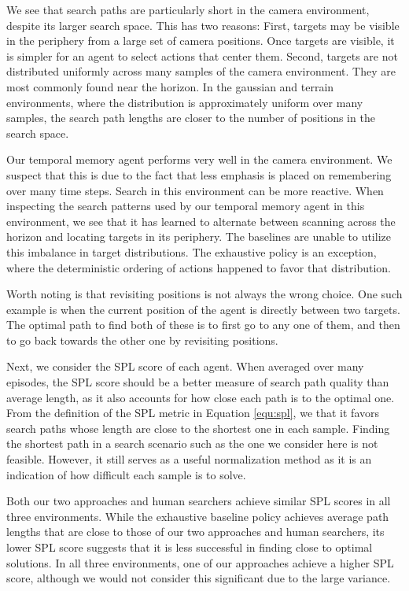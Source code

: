 We see that search paths are particularly short in the camera environment,
despite its larger search space.
This has two reasons:
First, targets may be visible in the periphery from a large set of camera positions.
Once targets are visible, it is simpler for an agent to select actions that center them.
Second, targets are not distributed uniformly across many samples of the camera environment.
They are most commonly found near the horizon.
In the gaussian and terrain environments, where the distribution is approximately uniform over many samples, the search path lengths are closer to the number of positions in the search space.

Our temporal memory agent performs very well in the camera environment.
We suspect that this is due to the fact that less emphasis is placed on remembering over many time steps.
Search in this environment can be more reactive.
When inspecting the search patterns used by our temporal memory agent in this environment, we see that it has learned to alternate between scanning across the horizon and locating targets in its periphery.
The baselines are unable to utilize this imbalance in target distributions.
The exhaustive policy is an exception, where the deterministic ordering of actions happened to favor that distribution. 

Worth noting is that revisiting positions is not always the wrong choice.
One such example is when the current position of the agent is directly between two targets.
The optimal path to find both of these is to first go to any one of them, and then to go back towards the other one by revisiting positions.

Next, we consider the SPL score of each agent.
When averaged over many episodes, the SPL score should be a better measure of search path quality than average length, as it also accounts for how close each path is to the optimal one.
From the definition of the SPL metric in Equation \ref{equ:spl}, we that it favors search paths whose length are close to the shortest one in each sample.
Finding the shortest path in a search scenario such as the one we consider here is not feasible.
However, it still serves as a useful normalization method as it is an indication of how difficult each sample is to solve.

Both our two approaches and human searchers achieve similar SPL scores in all three environments.
While the exhaustive baseline policy achieves average path lengths that are close to those of our two approaches and human searchers, its lower SPL score suggests that it is less successful in finding close to optimal solutions.
In all three environments, one of our approaches achieve a higher SPL score,
although we would not consider this significant due to the large variance.

